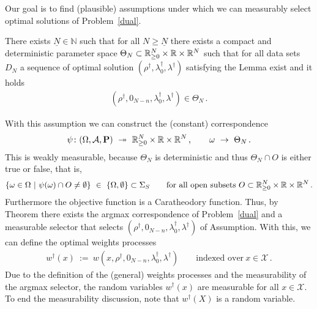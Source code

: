 Our goal is to find (plausible) assumptions under which we can measurably select optimal solutions of Problem~\ref{dual}.

\begin{assumption}
  There exists $\underline{N}\in\mathbb{N}$ such that 
  for all $N\ge \underline{N}$ 
  there exists a compact and deterministic parameter space
  $
  \Theta_N
  \subset
  \mathbb{R}^N_{\ge 0}
  \times
  \mathbb{R}
  \times
  \mathbb{R}^{N}
  $
  such that for all data sets $D_N$
  a sequence of optimal solution
  $(\rho^\dagger,\lambda_0^\dagger,\lambda^\dagger)$
  satisfying the Lemma
exist and it holds
\begin{gather*}
  (
  \rho^\dagger,
  0_{N-n},
  \lambda_0^\dagger,\lambda^\dagger)
  \in
  \Theta_N
  \,.
\end{gather*}
\end{assumption}

With this assumption we can construct the (constant) correspondence
\begin{align*}
  \psi
  \colon
  (\Omega,\mathcal{A},\P)
  \ 
  \twoheadrightarrow
  \ 
  \R^N_{\ge 0}
  \times
  \R
  \times
  \R^{N}
  \,,
  \qquad
  \omega
  \ 
  \to
  \ 
  \Theta_N
  \,.
\end{align*}
This is weakly measurable, because $\Theta_N$ is deterministic and thus
$\Theta_N\cap O$ is either true or false, that is,
  \begin{gather*}
    \left\{ 
      \omega\in \Omega
      \ 
      |
      \ 
      \psi(\omega)
      \cap
      O
      \neq
      \emptyset
    \right\}
    \ 
    \in
    \ 
    \left\{ \Omega,\emptyset \right\}
    \subset
    \Sigma_S
    \qquad
    \text{for all open subsets}
    \ 
    O
    \subset
  \R^N_{\ge 0}
  \times
  \R
  \times
  \R^{N}
    \,.
  \end{gather*}
  Furthermore the objective function is a Caratheodory function.
  Thus, by Theorem there exists the argmax correspondence  of Problem~\ref{dual} and a measurable selector that selects
  $(\rho^\dagger,0_{N-n},\lambda_0^\dagger,\lambda^\dagger)$ 
  of Assumption.
  With this, we can define the optimal weights processes
  \begin{gather*}
    w^\dagger(x)
    \ 
    :=
    \ 
    w
    \left( 
    x,\rho^\dagger,0_{N-n},\lambda_0^\dagger,\lambda^\dagger
    \right)
    \qquad
    \text{indexed over}\ 
    x\in\mathcal{X}\,.
  \end{gather*}
  Due to the definition of the (general) weights processes and the measurability of the argmax selector, the random variables $w^\dagger(x)$ are measurable for all $x\in\mathcal{X}$.
  To end the measurability discussion, note that $w^\dagger(X)$ is a random variable.
